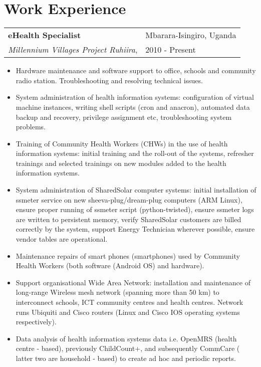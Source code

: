\documentclass[12pt,a4paper]{article}
\begin{document}
\section*{Work Experience}
\begin{tabularx}{\textwidth}{ X R }
  \textbf{eHealth Specialist} & Mbarara-Isingiro, Uganda\\
  \emph{Millennium Villages Project Ruhiira}, & 2010 - Present\\
\end{tabularx}
\begin{itemize}
  \item Hardware maintenance and software support to office, schools and community radio station. Troubleshooting and resolving technical issues.
  \item System administration of health information systems: configuration of virtual machine instances, writing shell scripts (cron and anacron), automated data backup and recovery, privilege assignment etc, troubleshooting system problems.
  \item Training of Community Health Workers (CHWs) in the use of health information systems: initial training and the roll-out of the systems, refresher trainings and selected trainings on new modules added to the health information systems.
  \item System administration of SharedSolar computer systems: initial installation of ssmeter service on new sheeva-plug/dream-plug computers (ARM Linux), ensure proper running of ssmeter script (python-twisted), ensure ssmeter logs are written to persistent memory, verify SharedSolar customers are billed correctly by the system, support Energy Technician wherever possible, ensure vendor tables are operational.
  \item Maintenance repairs of smart phones (smartphones) used by Community Health Workers (both software (Android OS) and hardware).
  \item Support organisational Wide Area Network: installation and maintenance of long-range Wireless mesh network (spanning more than 50 km) to interconnect schools, ICT community centres and health centres. Network runs Ubiquiti and Cisco routers (Linux and Cisco IOS operating systems respectively).
  \item Data analysis of health information systems data i.e. OpenMRS (health centre - based), previously ChildCount+, and subsequently CommCare ( latter two are household - based) to create ad hoc and periodic reports.

\end{itemize}
\end{document}

